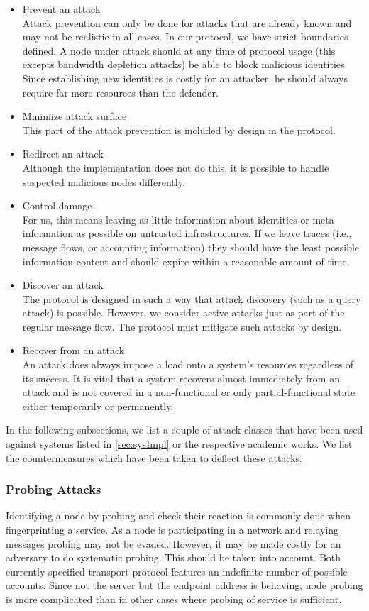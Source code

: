 \begin{itemize}
	\item Prevent an attack\\
	Attack prevention can only be done for attacks that are already known and may not be realistic in all cases. In our protocol, we have strict boundaries defined. A node under attack should at any time of protocol usage (this excepts bandwidth depletion attacks) be able to block malicious identities. Since establishing new identities is costly for an attacker, he should always require far more resources than the defender.
	\item Minimize attack surface\\
	This part of the attack prevention is included by design in the protocol.
	\item Redirect an attack\\
	Although the implementation does not do this, it is possible to handle suspected malicious nodes differently.
	\item Control damage\\
	For us, this means leaving as little information about identities or meta information as possible on untrusted infrastructures. If we leave traces (i.e., message flows, or accounting information) they should have the least possible information content and should expire within a reasonable amount of time.
	\item Discover an attack\\
	The protocol is designed in such a way that attack discovery (such as a query attack) is possible. However, we consider active attacks just as part of the regular message flow. The protocol must mitigate such attacks by design.
	\item Recover from an attack\\
	An attack does always impose a load onto a system's resources regardless of its success. It is vital that a system recovers almost immediately from an attack and is not covered in a non-functional or only partial-functional state either temporarily or permanently.
\end{itemize}

In the following subsections, we list a couple of attack classes that have been used against systems listed in \ref{sec:sysImpl} or the respective academic works. We list the countermeasures which have been taken to deflect these attacks.

\subsubsection{Probing Attacks}
Identifying a node by probing and check their reaction is commonly done when fingerprinting a service. As a node is participating in a network and relaying messages probing may not be evaded. However, it may be made costly for an adversary to do systematic probing. This should be taken into account. Both currently specified transport protocol features an indefinite number of possible accounts. Since not the server but the endpoint address is behaving, node probing is more complicated than in other cases where probing of service is sufficient. 

